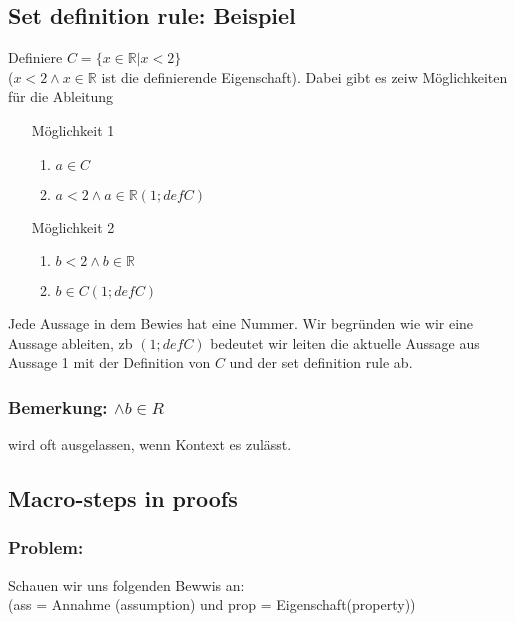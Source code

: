 \subsection{Set definition rule: Beispiel} Definiere $C = \{x \in \mathbb{R}\vert x < 2\}$ \\ ($x < 2 \land x \in \mathbb{R}$ ist die definierende Eigenschaft). Dabei gibt es zeiw Möglichkeiten für die Ableitung 
\begin{itemize}
    \item [Möglichkeit 1] 
    \begin{enumerate}
        \item $a \in C$
        \item $a < 2 \land a \in \mathbb{R} (1; def C)$
    \end{enumerate}
    \item [Möglichkeit 2] 
    \begin{enumerate}
        \item $b < 2 \land b \in \mathbb{R} $
        \item $b \in C (1; def C)$
    \end{enumerate}
\end{itemize}
Jede Aussage in dem Bewies hat eine Nummer. Wir begründen wie wir eine Aussage ableiten, zb $(1; def C)$ bedeutet wir leiten die aktuelle Aussage aus Aussage 1 mit der Definition von $C$ und der set definition rule ab.

\subsubsection*{Bemerkung: $\land b \in R$} wird oft ausgelassen, wenn Kontext es zulässt.

\subsection{Macro-steps in proofs}
\subsubsection*{Problem: } Schauen wir uns folgenden Bewwis an: \\ (ass = Annahme (assumption) und prop = Eigenschaft(property))

